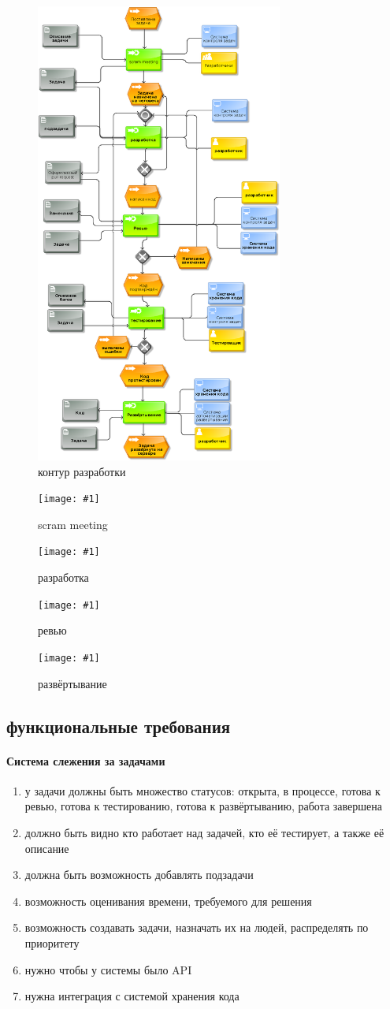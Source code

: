 \documentclass{article}
\begin{document}
\newcommand{\dia}[2]{
    \begin{figure}[!h]
        \texttt{[image: \#1]}
        \caption{#2}
    \end{figure}
    \pagebreak
}

\begin{figure}[h!]
    \includegraphics[height=6in]{pictures/2.png}
    \caption{контур разработки}
\end{figure}
\pagebreak
\dia{pictures/3.png}{scram meeting}
\dia{pictures/4.png}{разработка}
\dia{pictures/5.png}{ревью}
\dia{pictures/7.png}{развёртывание}

\subsection{функциональные требования}
\paragraph{Система слежения за задачами}
\begin{enumerate}
    \item{у задачи должны быть множество статусов:
    открыта, в процессе, готова к ревью, готова к тестированию, готова к развёртыванию, работа завершена}
    \item{должно быть видно кто работает над задачей, кто её тестирует, а также её описание}
    \item{должна быть возможность добавлять подзадачи}
    \item{возможность оценивания времени, требуемого для решения}
    \item{возможность создавать задачи, назначать их на людей, распределять по приоритету}
    \item{нужно чтобы у системы было API}
    \item{нужна интеграция с системой хранения кода}
\end{enumerate}
\end{document}
